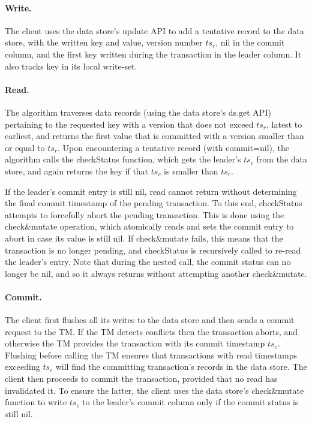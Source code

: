 \paragraph{Write.}
The client uses the data store's update API to add a tentative record to the data store, with the written key and value, 
version number $ts_r$, nil in the commit column, and the first key written during the transaction in the leader column.
It also tracks key in its local write-set.

\paragraph{Read.}
The algorithm traverses data  records (using the data store's ds.get API) pertaining
to the requested key with a version that does not exceed $ts_r$, latest to earliest, and returns the first value that is committed
with a  version smaller than or equal to $ts_r$. Upon
encountering a tentative record (with commit=nil), the algorithm calls the {\sc checkStatus} function, which
gets the leader's $ts_c$ from the data store, and again returns the key if that $ts_c$ is smaller than $ts_r$. 

If the leader's commit entry is still nil, read cannot return without determining the final commit timestamp
of the pending transaction. 
To this end, {\sc checkStatus} attempts to forcefully abort the pending transaction. This is done using the
 {check\&mutate} operation, which atomically reads and sets the commit entry to abort in case its value is still nil.
If check\&mutate fails, this means that the transaction is no longer pending, and {\sc checkStatus} is recursively called to
re-read the leader's entry. Note that during the nested call, the commit status can no longer be nil, and so it
always returns without attempting another check\&mutate.
 


\paragraph{Commit.}
The client first flushes all its writes to the data store and then sends a commit request to the TM. 
If the TM detects conflicts then the transaction aborts, and otherwise the TM provides the transaction with its commit  timestamp $ts_c$. 
Flushing before calling the TM ensures that transactions with read timestamps exceeding $ts_c$ 
will find the committing transaction's records in the data store.
The client then proceeds to commit the transaction, provided that no read has invalidated it. To ensure the latter, the client uses 
the data store's check\&mutate function to write $ts_c$ to the leader's commit column 
only if the commit status is still nil.

